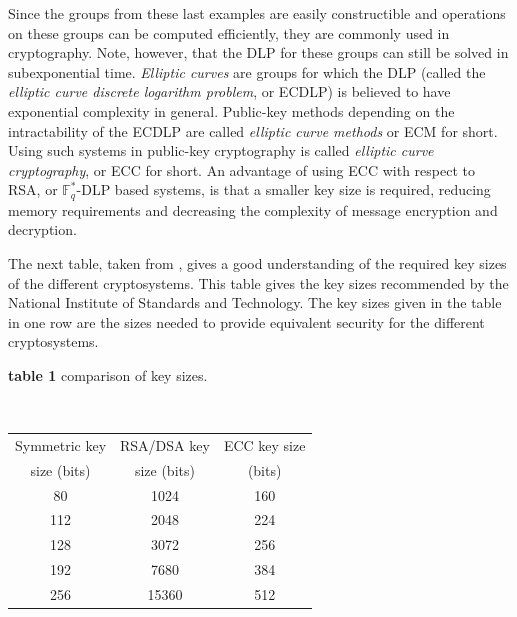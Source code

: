 \documentclass{article}
\numberwithin{equation}{section}
\theoremstyle{definition}
\newcommand{\FF}[1]{{\mathbb F}_{#1}} %
\begin{document}
Since the groups from these last examples are easily constructible and operations on these groups can be computed efficiently, they are commonly used in cryptography. Note, however, that the DLP for these groups can still be solved in subexponential time. \emph{Elliptic curves} are groups for which the DLP (called the \emph{elliptic curve discrete logarithm problem}, or ECDLP) is believed to have exponential complexity in general. Public-key methods depending on the intractability of the ECDLP are called \emph{elliptic curve methods} or ECM for short. Using such systems in public-key cryptography is called \emph{elliptic curve cryptography}, or ECC for short. An advantage of using ECC with respect to RSA, or $\FF{q}^*$-DLP based systems, is that a smaller key size is required, reducing memory requirements and decreasing the complexity of message encryption and decryption.\par 
The next table, taken from \cite{Vanstone}, gives a good understanding of the required key sizes of the different cryptosystems. This table gives the key sizes recommended by the National Institute of Standards and Technology. The key sizes given in the table in one row are the sizes needed to provide equivalent security for the different cryptosystems.
\begin{center}
  \caption{{\bf table 1} comparison of key sizes.}\\
  \begin{tabular}{ | c | c | c | }
    \hline
    Symmetric key & RSA/DSA key & ECC key size \\ 
    size (bits) & size (bits) & (bits) \\ \hline \hline
    80 & 1024  & 160 \\ \hline
    112 & 2048 & 224 \\ \hline
    128 & 3072 & 256 \\ \hline
    192 & 7680 & 384 \\ \hline
    256 & 15360 & 512 \\ 
    \hline
  \end{tabular}
\end{center}
\end{document}
